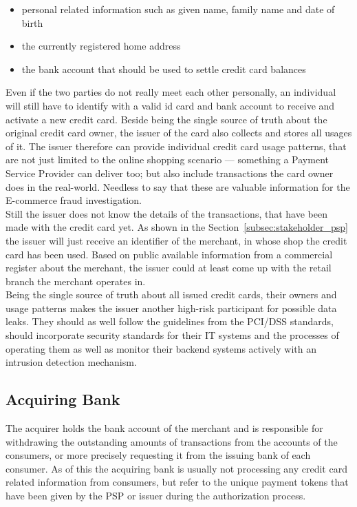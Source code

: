 \begin{itemize}
		\item personal related information such as given name, family name and date of birth
		\item the currently registered home address
		\item the bank account that should be used to settle credit card balances
\end{itemize}

Even if the two parties do not really meet each other personally, an individual will still have to identify with a valid id card and bank account to receive and activate a new credit card. Beside being the single source of truth about the original credit card owner, the issuer of the card also collects and stores all  usages of it. The issuer therefore can provide individual credit card usage patterns, that are not just limited to the online shopping scenario --- something a Payment Service Provider can deliver too; but also include transactions the card owner does in the real-world. Needless to say that these are valuable information for the \gls{E-commerce} fraud investigation. \\

Still the issuer does not know the details of the transactions, that have been made with the credit card yet. As shown in the Section~\ref{subsec:stakeholder_psp} the issuer will just receive an identifier of the merchant, in whose shop the credit card has been used. Based on public available information from a commercial register about the merchant, the issuer could at least come up with the retail branch the merchant operates in. \\

Being the single source of truth about all issued credit cards, their owners and usage patterns makes the issuer another high-risk participant for possible data leaks. They should as well follow the guidelines from the \gls{PCI/DSS} standards, should incorporate security standards for their \gls{IT} systems and the processes of operating them as well as monitor their backend systems actively with an intrusion detection mechanism.


\subsection{Acquiring Bank}
\label{subsec:stakeholder_acquirer}

The acquirer holds the bank account of the merchant and is responsible for withdrawing the outstanding amounts of transactions from the accounts of the consumers, or more precisely requesting it from the issuing bank of each consumer. As of this the acquiring bank is usually not processing any credit card related information from consumers, but refer to the unique payment tokens that have been given by the \gls{PSP} or issuer during the authorization process. \\

